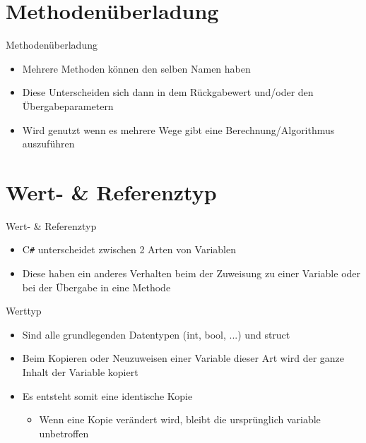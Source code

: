 \section{Methodenüberladung}
\begin{frame}{Methodenüberladung}
	\begin{itemize}
		\item Mehrere Methoden können den selben Namen haben
		\item Diese Unterscheiden sich dann in dem Rückgabewert und/oder den Übergabeparametern
		\item Wird genutzt wenn es mehrere Wege gibt eine Berechnung/Algorithmus auszuführen
	\end{itemize}
	
\end{frame}

\section{Wert- \& Referenztyp}
\begin{frame}{Wert- \& Referenztyp}
	\begin{itemize}
		\item C\texttt{\#} unterscheidet zwischen 2 Arten von Variablen
		\item Diese haben ein anderes Verhalten beim der Zuweisung zu einer Variable oder bei der Übergabe in eine Methode
	\end{itemize}
\end{frame}

\begin{frame}{Werttyp}
	\begin{itemize}
		\item Sind alle grundlegenden Datentypen (\alert{int}, \alert{bool}, ...) und \alert{struct}
	\end{itemize}
	\begin{itemize}
		\item Beim Kopieren oder Neuzuweisen einer Variable dieser Art wird der ganze Inhalt der Variable kopiert
		\item Es entsteht somit eine identische Kopie
		\begin{itemize}
			\item Wenn eine Kopie verändert wird, bleibt die ursprünglich variable unbetroffen
		\end{itemize}
	\end{itemize}
		
\end{frame}

